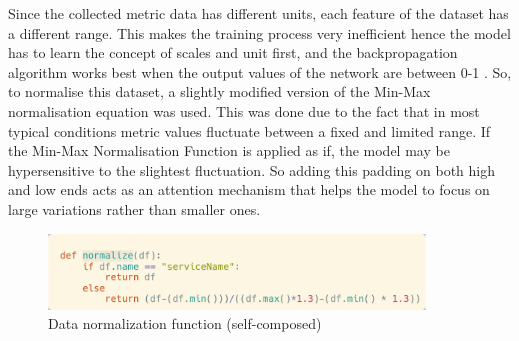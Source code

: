 Since the collected metric data has different units, each feature of the dataset has a different range. This makes the training process very inefficient hence the model has to learn the concept of scales and unit first, and the backpropagation algorithm works best when the output values of the network are between 0-1 \citep{sola1997importance}. So, to normalise this dataset, a slightly modified version of the Min-Max normalisation equation was used. This was done due to the fact that in most typical conditions metric values fluctuate between a fixed and limited range. If the Min-Max Normalisation Function is applied as if, the model may be hypersensitive to the slightest fluctuation. So adding this padding on both high and low ends acts as an attention mechanism that helps the model to focus on large variations rather than smaller ones.

\begin{figure}[H]
    \includegraphics[width=10cm]{assets/implementation/normalize-data.png}
    \caption{Data normalization function (self-composed)}
    \label{fig:normalize-data}
\end{figure}


